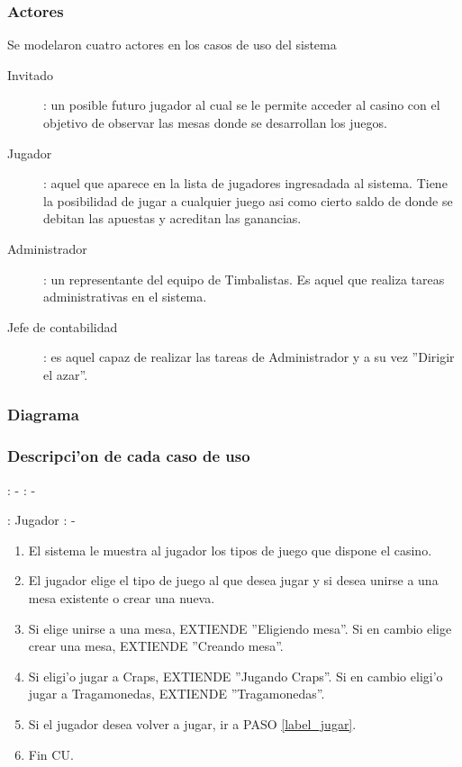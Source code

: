 \subsubsection{Actores}
Se modelaron cuatro actores en los casos de uso del sistema

\begin{description}
\item[Invitado]: un posible futuro jugador al cual se le permite acceder al casino con el objetivo de observar las mesas donde se desarrollan los juegos.
\item[Jugador]: aquel que aparece en la lista de jugadores ingresadada al sistema. Tiene la posibilidad de jugar a cualquier juego asi como cierto saldo de donde se debitan las apuestas y acreditan las ganancias.
\item[Administrador]: un representante del equipo de Timbalistas. Es aquel que realiza tareas administrativas en el sistema.
\item[Jefe de contabilidad]: es aquel capaz de realizar las tareas de Administrador y a su vez ''Dirigir el azar''.
\end{description}



\subsubsection{Diagrama}


\subsubsection{Descripci'on de cada caso de uso}

: - \newline
\indent{}: -

: Jugador \newline
\indent{}: -

\begin{enumerate}
\item El sistema le muestra al jugador los tipos de juego que dispone el casino.
\item El jugador elige el tipo de juego al que desea jugar y si desea unirse a una mesa existente o crear una nueva.
\item Si elige unirse a una mesa, EXTIENDE ''Eligiendo mesa''. Si en cambio elige crear una mesa, EXTIENDE ''Creando mesa''.
\item Si eligi'o jugar a Craps, EXTIENDE ''Jugando Craps''. Si en cambio eligi'o jugar a Tragamonedas, EXTIENDE ''Tragamonedas''.\label{label_jugar}
\item Si el jugador desea volver a jugar, ir a PASO \ref{label_jugar}.
\item Fin CU.
\end{enumerate}



